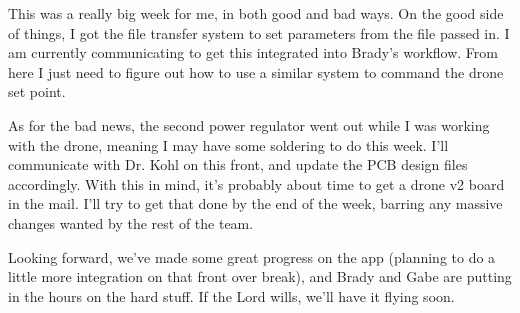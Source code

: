 \documentclass[12pt, titlepage]{article}
\begin{document}
This was a really big week for me, in both good and bad ways. On the good side of things, I got the file transfer system to set parameters from the file passed in. I am currently communicating to get this integrated into Brady's workflow. From here I just need to figure out how to use a similar system to command the drone set point.

As for the bad news, the second power regulator went out while I was working with the drone, meaning I may have some soldering to do this week. I'll communicate with Dr. Kohl on this front, and update the PCB design files accordingly. With this in mind, it's probably about time to get a drone v2 board in the mail. I'll try to get that done by the end of the week, barring any massive changes wanted by the rest of the team.

Looking forward, we've made some great progress on the app (planning to do a little more integration on that front over break), and Brady and Gabe are putting in the hours on the hard stuff. If the Lord wills, we'll have it flying soon.
\end{document}
